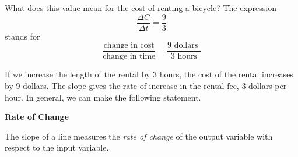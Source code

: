 \documentclass[10pt,]{book}
\theoremstyle{plain}
\theoremstyle{definition}
\theoremstyle{definition}
\theoremstyle{definition}
\theoremstyle{definition}
\numberwithin{equation}{section}
\begin{document}
    What does this value mean for the cost of renting a bicycle? The expression
    \begin{equation*}\frac{\Delta C}{\Delta t}= \frac{9}{3}\end{equation*}
    stands for
    \begin{equation*}\frac{\text{change in cost}}{\text{change in time}}= \frac{9 \text{ dollars }}{3 \text{ hours}}\end{equation*}
%
\par

    If we increase the length of the rental by 3 hours, the cost of the rental increases by 9 dollars. The slope gives the rate of increase in the rental fee, 3 dollars per hour. In general, we can make the following statement.
%
\begin{mdframed}[style=assemblage]%
\noindent\textbf{\large Rate of Change}\label{assemblage-11}\par\medskip

    The slope of a line measures the \emph{rate of change} of the output variable with respect to the input variable.
%
\end{mdframed}
\par
\end{document}
